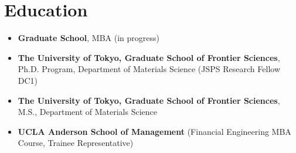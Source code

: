 \documentclass[uplatex,a4j,10.5pt,dvipdfmx]{jsarticle}
\begin{document}
\section*{Education}
\begin{itemize}[leftmargin=*]
	\item \textbf{Graduate School}, MBA (in progress)
	\item \textbf{The University of Tokyo, Graduate School of Frontier Sciences}, Ph.D. Program, Department of Materials Science (JSPS Research Fellow DC1)
	\item \textbf{The University of Tokyo, Graduate School of Frontier Sciences}, M.S., Department of Materials Science
	\item \textbf{UCLA Anderson School of Management} (Financial Engineering MBA Course, Trainee Representative)
\end{itemize}
\end{document}
